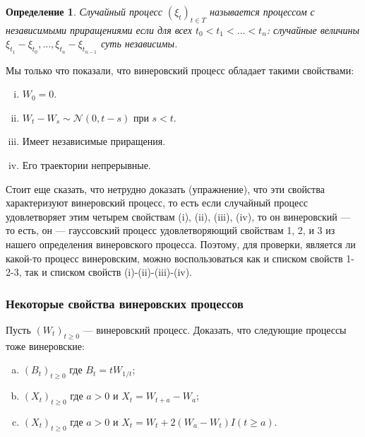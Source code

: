 \documentclass[10pt]{article}
\newtheorem{defn}[thm]{Определение}
\theoremstyle{boldnormal}
\theoremstyle{boldremark}
\newenvironment{zadachsem}
  {\pushQED{\qed}\renewcommand{\qedsymbol}{$\triangleleft$}\zadachsemm}
  {\popQED\endzadachsemm}
\begin{document}
\begin{defn}\label{defn:indincrproc}
Случайный процесс \((\xi_t)_{t\in T}\)
называется \emph{процессом с независимыми приращениями}
если для всех $t_0 < t_1 < \dots < t_n$:
случайные величины $\xi_{t_1}-\xi_{t_0}, \dots, \xi_{t_n}-\xi_{t_{n-1}}$
суть независимы.
\end{defn}
Мы только что показали, что
винеровский процесс обладает такими свойствами:
\begin{enumerate}[(i)]
    \item $W_0=0$.
    \item $W_t - W_s \sim \mathcal{N}(0, t-s)$ при  $s<t$.
    \item Имеет независимые приращения.
    \item Его траектории непрерывные.
\end{enumerate}
Стоит еще сказать, что нетрудно доказать (упражнение),
что эти свойства характеризуют винеровский процесс,
то есть если случайный процесс удовлетворяет этим четырем свойствам
(i), (ii), (iii), (iv),
то он винеровский --- то есть, 
он --- гауссовский процесс удовлетворяющий свойствам 1, 2, и 3 
из нашего определения винеровского процесса. 
Поэтому, для проверки, является ли какой-то процесс винеровским,
можно воспользоваться как и списком свойств 1-2-3, так 
и списком свойств (i)-(ii)-(iii)-(iv).

\subsubsection{Некоторые свойства винеровских процессов}

\begin{zadachsem}
    Пусть \((W_t)_{t\geq 0}\) --- винеровский процесс. Доказать,
    что следующие процессы
    тоже винеровские:
    \begin{enumerate}[(a)]
    \item \((B_t)_{t\geq 0}\) где \(B_t = t W_{1/t}\);
    \item \((X_t)_{t\geq 0}\) где \(a>0\) и \(X_t = W_{t+a}-W_a\);
    \item \((X_t)_{t\geq 0}\) где \(a>0\) и 
    \(X_t = W_t  + 2(W_{a}-W_t) I(t\geq a)\).
    \end{enumerate}
\end{zadachsem}
\end{document}
